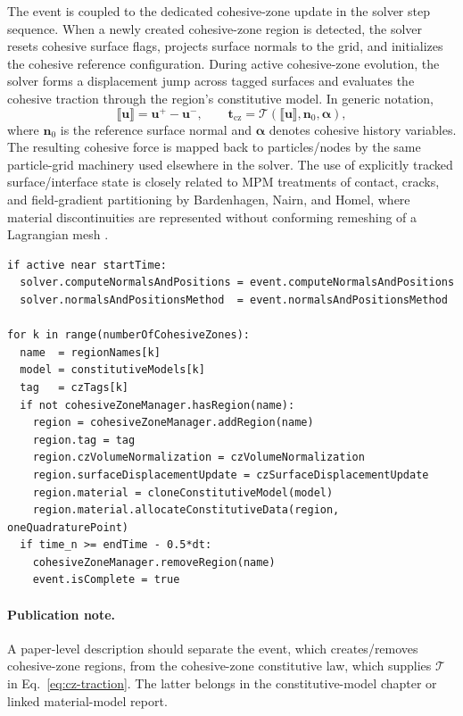 The event is coupled to the dedicated cohesive-zone update in the solver step sequence.  When a newly created cohesive-zone region is detected, the solver resets cohesive surface flags, projects surface normals to the grid, and initializes the cohesive reference configuration.  During active cohesive-zone evolution, the solver forms a displacement jump across tagged surfaces and evaluates the cohesive traction through the region's constitutive model.  In generic notation,
\begin{equation}
  \llbracket\mathbf{u}\rrbracket = \mathbf{u}^{+}-\mathbf{u}^{-},\qquad
  \mathbf{t}_{\mathrm{cz}} = \mathcal{T}(\llbracket\mathbf{u}\rrbracket,\mathbf{n}_0,\boldsymbol{\alpha}),
  \label{eq:cz-traction}
\end{equation}
where $\mathbf{n}_0$ is the reference surface normal and $\boldsymbol{\alpha}$ denotes cohesive history variables.  The resulting cohesive force is mapped back to particles/nodes by the same particle-grid machinery used elsewhere in the solver.  The use of explicitly tracked surface/interface state is closely related to MPM treatments of contact, cracks, and field-gradient partitioning by Bardenhagen, Nairn, and Homel, where material discontinuities are represented without conforming remeshing of a Lagrangian mesh \cite{bardenhagen2001contact,nairn2003cramp,homel2016dfg}.

\begin{lstlisting}[caption={CohesiveZone event pseudocode.}]
if active near startTime:
  solver.computeNormalsAndPositions = event.computeNormalsAndPositions
  solver.normalsAndPositionsMethod  = event.normalsAndPositionsMethod

for k in range(numberOfCohesiveZones):
  name  = regionNames[k]
  model = constitutiveModels[k]
  tag   = czTags[k]
  if not cohesiveZoneManager.hasRegion(name):
    region = cohesiveZoneManager.addRegion(name)
    region.tag = tag
    region.czVolumeNormalization = czVolumeNormalization
    region.surfaceDisplacementUpdate = czSurfaceDisplacementUpdate
    region.material = cloneConstitutiveModel(model)
    region.material.allocateConstitutiveData(region, oneQuadraturePoint)
  if time_n >= endTime - 0.5*dt:
    cohesiveZoneManager.removeRegion(name)
    event.isComplete = true
\end{lstlisting}

\paragraph{Publication note.}
A paper-level description should separate the event, which creates/removes cohesive-zone regions, from the cohesive-zone constitutive law, which supplies $\mathcal{T}$ in Eq.~\eqref{eq:cz-traction}.  The latter belongs in the constitutive-model chapter or linked material-model report.


